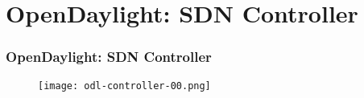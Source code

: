 \section{OpenDaylight: SDN Controller}

\begin{frame}[allowframebreaks]
\frametitle{OpenDaylight: SDN Controller}

\begin{center}
  \begin{figure}
    \texttt{[image: odl-controller-00.png]}
  \end{figure}
\end{center}

\end{frame}
